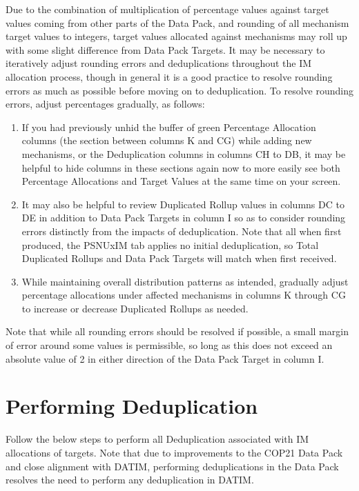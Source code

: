 \documentclass[
  openany]{book}
\begin{document}
Due to the combination of multiplication of percentage values against
target values coming from other parts of the Data Pack, and rounding of
all mechanism target values to integers, target values allocated against
mechanisms may roll up with some slight difference from Data Pack
Targets. It may be necessary to iteratively adjust rounding errors and
deduplications throughout the IM allocation process, though in general
it is a good practice to resolve rounding errors as much as possible
before moving on to deduplication. To resolve rounding errors, adjust
percentages gradually, as follows:

\begin{enumerate}
\def\labelenumi{\arabic{enumi})}
\item
  If you had previously unhid the buffer of green Percentage
  Allocation columns (the section between columns K and CG) while
  adding new mechanisms, or the Deduplication columns in columns CH to
  DB, it may be helpful to hide columns in these sections again now to
  more easily see both Percentage Allocations and Target Values at the
  same time on your screen.
\item
  It may also be helpful to review Duplicated Rollup values in columns
  DC to DE in addition to Data Pack Targets in column I so as to
  consider rounding errors distinctly from the impacts of
  deduplication. Note that all when first produced, the PSNUxIM tab
  applies no initial deduplication, so Total Duplicated Rollups and
  Data Pack Targets will match when first received.
\item
  While maintaining overall distribution patterns as intended,
  gradually adjust percentage allocations under affected mechanisms in
  columns K through CG to increase or decrease Duplicated Rollups as
  needed.
\end{enumerate}

Note that while all rounding errors should be resolved if possible, a
small margin of error around some values is permissible, so long as this
does not exceed an absolute value of 2 in either direction of the Data
Pack Target in column I.

\hypertarget{performing-deduplication}{%
\section{Performing Deduplication}\label{performing-deduplication}}

Follow the below steps to perform all Deduplication associated with IM
allocations of targets. Note that due to improvements to the COP21 Data
Pack and close alignment with DATIM, performing deduplications in the
Data Pack resolves the need to perform any deduplication in DATIM.
\end{document}

